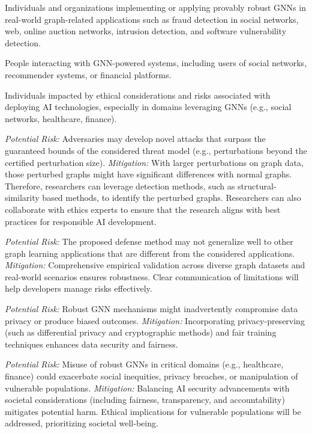  Individuals and organizations implementing or applying provably robust GNNs in real-world graph-related applications such as fraud detection in social networks, web, online auction networks, intrusion detection, and software vulnerability detection.

 People interacting with GNN-powered systems, including users of social networks, recommender systems, or financial platforms.

 Individuals impacted by ethical considerations and risks associated with deploying AI technologies, especially in domains leveraging GNNs (e.g., social networks, healthcare, finance).

\vspace{+0.1in}
\vspace{+0.05in}


\emph{Potential Risk:} Adversaries may develop novel attacks that surpass the guaranteed bounds of the considered threat model (e.g., perturbations beyond the certified perturbation size). \emph{Mitigation:} With larger perturbations on graph data, those perturbed graphs might have significant differences with normal graphs. Therefore, researchers can leverage detection methods, such as structural-similarity based methods, to identify the perturbed graphs. Researchers can also collaborate with ethics experts to ensure that the research aligns with best practices for responsible AI development.

\emph{Potential Risk:}  The proposed defense method may not generalize well to other graph learning applications that are different from the considered applications.
\emph{Mitigation:} Comprehensive empirical validation across diverse graph datasets and real-world scenarios ensures robustness. Clear communication of limitations will help developers manage risks effectively.

\emph{Potential Risk:}  Robust GNN mechanisms might inadvertently compromise data privacy or produce biased outcomes.
\emph{Mitigation:} Incorporating privacy-preserving (such as differential privacy and cryptographic methods) and fair training techniques enhances data security and fairness.

\emph{Potential Risk:} Misuse of robust GNNs in critical domains (e.g., healthcare, finance) could exacerbate social inequities, privacy breaches, or manipulation of vulnerable populations.
\emph{Mitigation:} Balancing AI security advancements with societal considerations (including fairness, transparency, and accountability) mitigates potential harm. Ethical implications for vulnerable populations will be addressed, prioritizing societal well-being.

